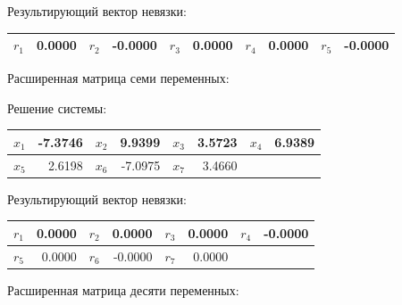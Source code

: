 Результирующий вектор невязки:
\begin{table}[H]
\centering
\small
\begin{tabular}{|c|r||c|r||c|r||c|r||c|r|}
\hline
$r_{1}$ & 0.0000 & $r_{2}$ & -0.0000 & $r_{3}$ & 0.0000 & $r_{4}$ & 0.0000 & $r_{5}$ & -0.0000 \\ \hline
\end{tabular}
\end{table}

Расширенная матрица семи переменных:

\begin{MatrixBox}
%
\end{MatrixBox}

Решение системы:
\begin{table}[H]
\centering
\small
\begin{tabular}{|c|r||c|r||c|r||c|r|}
\hline
$x_{1}$ & -7.3746 & $x_{2}$ & 9.9399 & $x_{3}$ & 3.5723 & $x_{4}$ & 6.9389 \\ \hline
$x_{5}$ & 2.6198 & $x_{6}$ & -7.0975 & $x_{7}$ & 3.4660 & \multicolumn{2}{c|}{} \\ \hline
\end{tabular}
\end{table}

Результирующий вектор невязки:
\begin{table}[H]
\centering
\small
\begin{tabular}{|c|r||c|r||c|r||c|r|}
\hline
$r_{1}$ & 0.0000 & $r_{2}$ & 0.0000 & $r_{3}$ & 0.0000 & $r_{4}$ & -0.0000 \\ \hline
$r_{5}$ & 0.0000 & $r_{6}$ & -0.0000 & $r_{7}$ & 0.0000 & \multicolumn{2}{c|}{} \\ \hline
\end{tabular}
\end{table}

Расширенная матрица десяти переменных:

